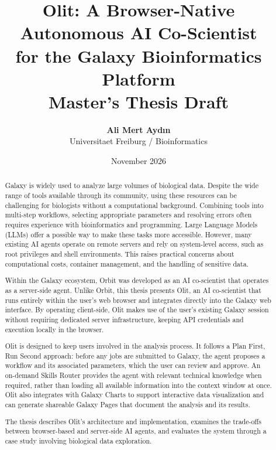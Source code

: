 \documentclass[12pt,a4paper]{report}
\title{\textbf{\Large Olit: A Browser-Native Autonomous AI Co-Scientist\\for the Galaxy Bioinformatics Platform}\\[1.5cm]
\large Master's Thesis Draft}
\author{\textbf{Ali Mert Aydın}\\[0.5cm]
Universitaet Freiburg / Bioinformatics}
\date{November 2026}
\begin{document}
\maketitle

\begin{abstract}
Galaxy is widely used to analyze large volumes of biological data. Despite the wide range of tools available through its community, using these resources can be challenging for biologists without a computational background. Combining tools into multi-step workflows, selecting appropriate parameters and resolving errors often requires experience with bioinformatics and programming. Large Language Models (LLMs) offer a possible way to make these tasks more accessible. However, many existing AI agents operate on remote servers and rely on system-level access, such as root privileges and shell environments. This raises practical concerns about computational costs, container management, and the handling of sensitive data.

Within the Galaxy ecosystem, Orbit was developed as an AI co-scientist that operates as a server-side agent. Unlike Orbit, this thesis presents Olit, an AI co-scientist that runs entirely within the user's web browser and integrates directly into the Galaxy web interface. By operating client-side, Olit makes use of the user's existing Galaxy session without requiring dedicated server infrastructure, keeping API credentials and execution locally in the browser.

Olit is designed to keep users involved in the analysis process. It follows a Plan First, Run Second approach: before any jobs are submitted to Galaxy, the agent proposes a workflow and its associated parameters, which the user can review and approve. An on-demand Skills Router provides the agent with relevant technical knowledge when required, rather than loading all available information into the context window at once. Olit also integrates with Galaxy Charts to support interactive data visualization and can generate shareable Galaxy Pages that document the analysis and its results.

The thesis describes Olit's architecture and implementation, examines the trade-offs between browser-based and server-side AI agents, and evaluates the system through a case study involving biological data exploration.
\end{abstract}

\tableofcontents
\listoffigures
\listoftables

\clearpage


\clearpage

\clearpage

\clearpage

\nocite{*}


\end{document}
